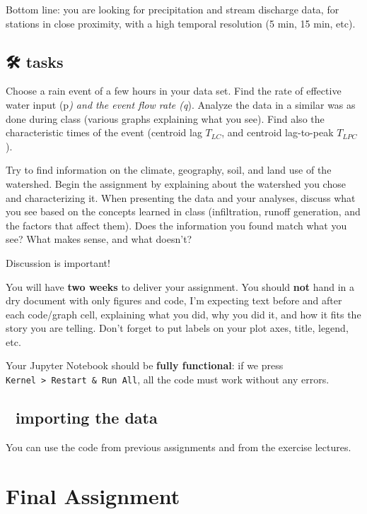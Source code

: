 \documentclass[
  letterpaper,
  DIV=11,
  numbers=noendperiod]{scrreprt}
\begin{document}
Bottom line: you are looking for precipitation and stream discharge
data, for stations in close proximity, with a high temporal resolution
(5 min, 15 min, etc).

\hypertarget{tasks-3}{%
\section{🛠 tasks}\label{tasks-3}}

Choose a rain event of a few hours in your data set. Find the rate of
effective water input (p\emph{) and the event flow rate (q}). Analyze
the data in a similar was as done during class (various graphs
explaining what you see). Find also the characteristic times of the
event (centroid lag \(T_{LC}\), and centroid lag-to-peak \(T_{LPC}\)).

Try to find information on the climate, geography, soil, and land use of
the watershed. Begin the assignment by explaining about the watershed
you chose and characterizing it. When presenting the data and your
analyses, discuss what you see based on the concepts learned in class
(infiltration, runoff generation, and the factors that affect them).
Does the information you found match what you see? What makes sense, and
what doesn't?

Discussion is important!

You will have \textbf{two weeks} to deliver your assignment. You should
\textbf{not} hand in a dry document with only figures and code, I'm
expecting text before and after each code/graph cell, explaining what
you did, why you did it, and how it fits the story you are telling.
Don't forget to put labels on your plot axes, title, legend, etc.

Your Jupyter Notebook should be \textbf{fully functional}: if we press
\texttt{Kernel\ \textgreater{}\ Restart\ \&\ Run\ All}, all the code
must work without any errors.

\hypertarget{importing-the-data-1}{%
\section{🚚 importing the data}\label{importing-the-data-1}}

You can use the code from previous assignments and from the exercise
lectures.

\hypertarget{final-assignment}{%
\chapter{Final Assignment}\label{final-assignment}}
\end{document}
